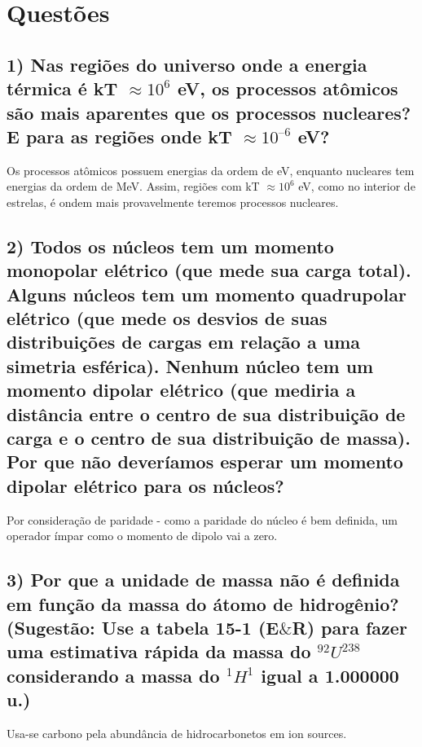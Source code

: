 \documentclass{article}
\begin{document}
\section{Questões}
\subsection*{1) Nas regiões do universo onde a energia térmica é kT $\approx 10^6$ eV, os processos atômicos são mais aparentes que os processos nucleares? E para as regiões onde kT $ \approx 10^{–6}$ eV?}

Os processos atômicos possuem energias da ordem de eV, enquanto nucleares tem energias da ordem de MeV. Assim, regiões com kT $\approx 10^6$ eV, como no interior de estrelas, é ondem mais provavelmente teremos processos nucleares.

\subsection*{2) Todos os núcleos tem um momento monopolar elétrico (que mede sua carga total). Alguns núcleos tem um momento quadrupolar elétrico (que mede os desvios de suas distribuições de cargas em relação a uma simetria esférica). Nenhum núcleo tem um momento dipolar elétrico (que mediria a distância entre o centro de sua distribuição de carga e o centro de sua distribuição de massa). Por que não deveríamos esperar um momento dipolar elétrico para os núcleos?}
Por consideração de paridade - como a paridade do núcleo é bem definida, um operador ímpar como o momento de dipolo vai a zero.

\subsection*{3) Por que a unidade de massa não é definida em função da massa do átomo de hidrogênio? (Sugestão: Use a tabela 15-1 (E$\&$R) para fazer uma estimativa rápida da massa do ${}^{92}U^{238}$ considerando a massa do ${}^{1}H^{1}$ igual a 1.000000 u.)}
Usa-se carbono pela abundância de hidrocarbonetos em ion sources.

\end{document}
